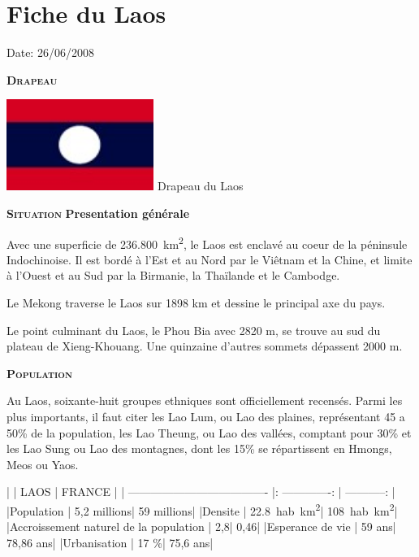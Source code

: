\section{Fiche du Laos}

Date: 26/06/2008

\begin{multicols}{2}

\textbf{\textsc{Drapeau}}

\hspace*{-0.65cm}
\includegraphics[width=4.8cm]{articles/Fiche-du-laos/1214470058Q382.jpg}
Drapeau du Laos


\textbf{\textsc{Situation}}
\textbf{Presentation générale}

Avec une superficie de \SI{236.800}{km^2}, le Laos est enclavé au coeur de la péninsule Indochinoise. Il est bordé à l’Est et au Nord par le Viêtnam et la Chine, et limite à l’Ouest et au Sud par la Birmanie, la Thaïlande et le Cambodge.

Le Mekong traverse le Laos sur 1898 km et dessine le principal axe du pays.

Le point culminant du Laos, le Phou Bia avec 2820 m, se trouve au sud du plateau de Xieng-Khouang. Une quinzaine d’autres sommets dépassent 2000 m.

\textbf{\textsc{Population}}

Au Laos, soixante-huit groupes ethniques sont officiellement recensés. Parmi les plus importants, il faut citer les Lao Lum, ou Lao des plaines, représentant 45 a 50\% de la population, les Lao Theung, ou Lao des vallées, comptant pour 30\% et les Lao Sung ou Lao des montagnes, dont les 15\% se répartissent en Hmongs, Meos ou Yaos.

|                                       |       LAOS      |    FRANCE    |
| ------------------------------------- |: -------------: | -----------: |
|Population                             |     5,2 millions|  	59 millions|
|Densite                                |     \SI{22,8}{hab.km^2}|   \SI{108}{hab.km^2}|
|Accroissement naturel de la population |              2,8|          0,46|
|Esperance de vie                       |           59 ans|     78,86 ans|
|Urbanisation                           |            17 \%|      75,6 ans|


\end{multicols}
